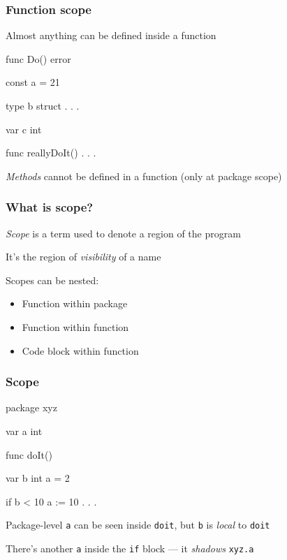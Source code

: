 \documentclass[handout,compress,t,11pt]{beamer}
\begin{document}
\begin{frame}[fragile]
    \frametitle{Function scope}
    Almost anything can be defined inside a function
\begin{golang}
func Do() error {
    const a = 21

    type b struct {
        . . .
    }

    var c int

    func reallyDoIt() {
        . . .
    }
}
\end{golang}
\vspace{0.4\baselineskip}
{\em Methods} cannot be defined in a function (only at package scope)
\end{frame}

\begin{frame}[fragile]
    \frametitle{What is scope?}
    {\em Scope} is a term used to denote a region of the program \par
    \vspace{\baselineskip}
    It's the region of {\em visibility} of a name \par
    \vspace{\baselineskip}
    Scopes can be nested:
    \begin{itemize}
        \item Function within package
        \item Function within function
        \item Code block within function
    \end{itemize}
\end{frame}

\begin{frame}[fragile]
    \frametitle{Scope}
\begin{golang}
package xyz

var a int

func doIt() {
    var b int
    a = 2
    
    if b < 10 {
        a := 10
        . . .
    }
}
\end{golang}
Package-level \verb|a| can be seen inside \verb|doit|, but \verb|b| is {\em local} to \verb|doit| \par
\vspace{0.4\baselineskip}
There's another \verb|a| inside the \verb|if| block --- it {\em shadows} \verb|xyz.a|
\end{frame}
\end{document}
